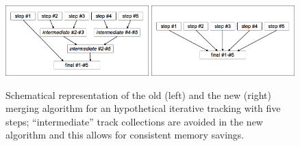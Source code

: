 \begin{figure}[h]
\begin{center}
\includegraphics*[width=0.492\textwidth]{figs/oldMerge.png}
\hskip 0.5mm
\includegraphics*[width=0.492\textwidth]{figs/newMerge.png}
\caption{Schematical representation of the old 
  (left) and the new (right) merging algorithm for an hypothetical
  iterative tracking with five steps; ``intermediate'' track
  collections are avoided in the new
  algorithm and this allows for consistent memory savings.}
\label{fig:merge}
\end{center}
\end{figure}


